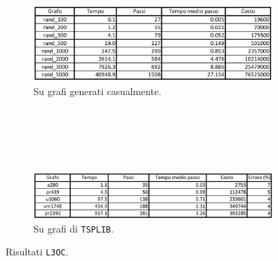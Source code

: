 \begin{figure}[H]
    \centering
    \begin{subfigure}{\linewidth}
        \centering
        \includegraphics[width=400pt]{img/L3OCrandom.png}
        \caption*{Su grafi generati casualmente.}
    \end{subfigure}
    \ \\
    \ \\
    \ \\
    \ \\
    \begin{subfigure}{\linewidth}
        \centering
        \includegraphics[width=400pt]{img/L3OCtsplib.png}
        \caption*{Su grafi di \texttt{TSPLIB}.}
    \end{subfigure}
    \caption{Risultati \texttt{L3OC}.}
\end{figure}
\ \\
\ \\

